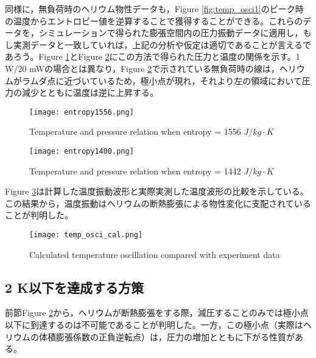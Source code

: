 同様に，無負荷時のヘリウム物性データも，Figure \ref{fig:temp_osci1}のピーク時の温度からエントロピー値を逆算することで獲得することができる。これらのデータを，シミュレーションで得られた膨張空間内の圧力振動データに適用し，もし実測データと一致していれば，上記の分析や仮定は適切であることが言えるであろう。Figure \ref{fig:entropy1556}とFigure \ref{fig:entropy1400}にこの方法で得られた圧力と温度の関係を示す。1 W/20 mWの場合とは異なり，Figure \ref{fig:entropy1400}で示されている無負荷時の線は，ヘリウムがラムダ点に近づいているため，極小点が現れ，それより左の領域において圧力の減少とともに温度は逆に上昇する。

\begin{figure}[h]
\begin{center}
\texttt{[image: entropy1556.png]}
\caption{Temperature and pressure relation when entropy = 1556 $J/kg\cdot K$}
\label{fig:entropy1556}
\end{center}
\end{figure}

\begin{figure}[h]
\begin{center}
\texttt{[image: entropy1400.png]}
\caption{Temperature and pressure relation when entropy = 1442 $J/kg\cdot K$}
\label{fig:entropy1400}
\end{center}
\end{figure}

Figure \ref{fig:temp_osci_cal}は計算した温度振動波形と実際実測した温度波形の比較を示している。この結果から，温度振動はヘリウムの断熱膨張による物性変化に支配されていることが判明した。


\begin{figure}[h]
\begin{center}
\texttt{[image: temp\_osci\_cal.png]}
\caption{Calculated temperature oscillation compared with experiment data}
\label{fig:temp_osci_cal}
\end{center}
\end{figure}


\subsection{2 K以下を達成する方策}

前節Figure \ref{fig:entropy1400}から，ヘリウムが断熱膨張をする際，減圧することのみでは極小点以下に到達するのは不可能であることが判明した。一方，この極小点（実際はヘリウムの体積膨張係数の正負逆転点）は，圧力の増加とともに下がる性質がある。

